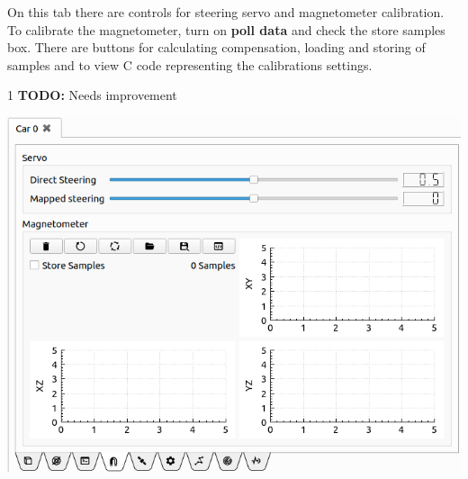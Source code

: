 \documentclass[12pt]{article} %
\def\printtodos{0}
\newcommand{\todo}[1]{
  \if\printtodos1
      {\color{red} \textbf{TODO:} #1}
  \fi}
\begin{document}
\noindent\begin{minipage}{0.5\textwidth} %
 On this tab there are controls for
steering servo and magnetometer calibration.  To calibrate the
magnetometer, turn on {\bf poll data} and check the store samples
box. There are buttons for calculating compensation, loading and
storing of samples and to view C code representing the calibrations
settings.

\todo{Needs improvement}

\end{minipage}
\begin{minipage}{0.5\textwidth}
  \noindent \includegraphics[width=\textwidth]{./screens/Car_calibration.png}
\end{minipage}
\end{document}
